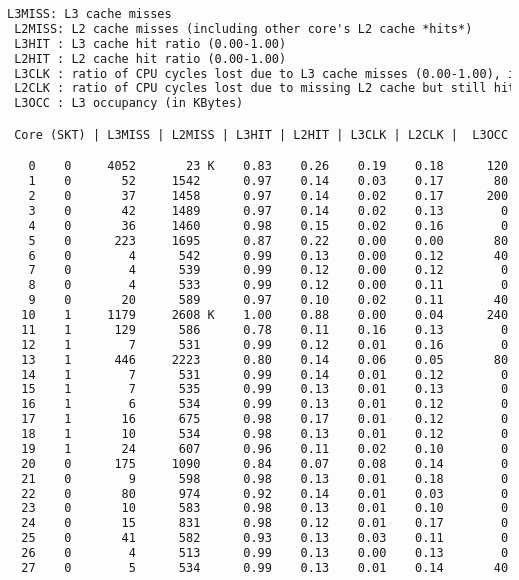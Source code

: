 \begin{lstlisting}[language=TeX]
 L3MISS: L3 cache misses
 L2MISS: L2 cache misses (including other core's L2 cache *hits*)
 L3HIT : L3 cache hit ratio (0.00-1.00)
 L2HIT : L2 cache hit ratio (0.00-1.00)
 L3CLK : ratio of CPU cycles lost due to L3 cache misses (0.00-1.00), in some cases could be >1.0 due to a higher memory latency
 L2CLK : ratio of CPU cycles lost due to missing L2 cache but still hitting  L3 cache (0.00-1.00)
 L3OCC : L3 occupancy (in KBytes)

 Core (SKT) | L3MISS | L2MISS | L3HIT | L2HIT | L3CLK | L2CLK |  L3OCC

   0    0     4052       23 K    0.83    0.26    0.19    0.18      120
   1    0       52     1542      0.97    0.14    0.03    0.17       80
   2    0       37     1458      0.97    0.14    0.02    0.17      200
   3    0       42     1489      0.97    0.14    0.02    0.13        0
   4    0       36     1460      0.98    0.15    0.02    0.16        0
   5    0      223     1695      0.87    0.22    0.00    0.00       80
   6    0        4      542      0.99    0.13    0.00    0.12       40
   7    0        4      539      0.99    0.12    0.00    0.12        0
   8    0        4      533      0.99    0.12    0.00    0.11        0
   9    0       20      589      0.97    0.10    0.02    0.11       40
  10    1     1179     2608 K    1.00    0.88    0.00    0.04      240
  11    1      129      586      0.78    0.11    0.16    0.13        0
  12    1        7      531      0.99    0.12    0.01    0.16        0
  13    1      446     2223      0.80    0.14    0.06    0.05       80
  14    1        7      531      0.99    0.14    0.01    0.12        0
  15    1        7      535      0.99    0.13    0.01    0.13        0
  16    1        6      534      0.99    0.13    0.01    0.12        0
  17    1       16      675      0.98    0.17    0.01    0.12        0
  18    1       10      534      0.98    0.13    0.01    0.12        0
  19    1       24      607      0.96    0.11    0.02    0.10        0
  20    0      175     1090      0.84    0.07    0.08    0.14        0
  21    0        9      598      0.98    0.13    0.01    0.18        0
  22    0       80      974      0.92    0.14    0.01    0.03        0
  23    0       10      583      0.98    0.13    0.01    0.10        0
  24    0       15      831      0.98    0.12    0.01    0.17        0
  25    0       41      582      0.93    0.13    0.03    0.11        0
  26    0        4      513      0.99    0.13    0.00    0.13        0
  27    0        5      534      0.99    0.13    0.01    0.14       40

\end{lstlisting}
